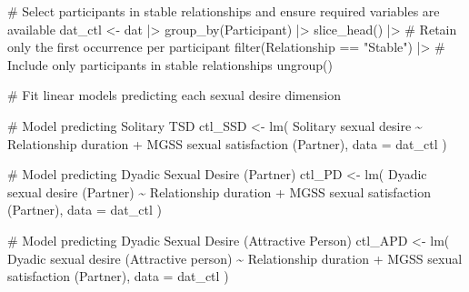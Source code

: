 \documentclass[
  bookmarksnumbered]{article}
\newenvironment{Shaded}{\begin{snugshade}}{\end{snugshade}}
\newcommand{\AttributeTok}[1]{\textcolor[rgb]{0.80,0.80,0.80}{#1}}
\newcommand{\CommentTok}[1]{\textcolor[rgb]{0.50,0.62,0.50}{#1}}
\newcommand{\FunctionTok}[1]{\textcolor[rgb]{0.94,0.94,0.56}{#1}}
\newcommand{\NormalTok}[1]{\textcolor[rgb]{0.80,0.80,0.80}{#1}}
\newcommand{\OtherTok}[1]{\textcolor[rgb]{0.94,0.94,0.56}{#1}}
\newcommand{\SpecialCharTok}[1]{\textcolor[rgb]{0.86,0.64,0.64}{#1}}
\newcommand{\StringTok}[1]{\textcolor[rgb]{0.80,0.58,0.58}{#1}}
\begin{document}
\begin{Shaded}
\begin{Highlighting}[]
\CommentTok{\# Select participants in stable relationships and ensure required variables are available}
\NormalTok{dat\_ctl }\OtherTok{\textless{}{-}}\NormalTok{ dat }\SpecialCharTok{|\textgreater{}}
  \FunctionTok{group\_by}\NormalTok{(Participant) }\SpecialCharTok{|\textgreater{}}
  \FunctionTok{slice\_head}\NormalTok{() }\SpecialCharTok{|\textgreater{}} \CommentTok{\# Retain only the first occurrence per participant}
  \FunctionTok{filter}\NormalTok{(Relationship }\SpecialCharTok{==} \StringTok{"Stable"}\NormalTok{) }\SpecialCharTok{|\textgreater{}} \CommentTok{\# Include only participants in stable relationships}
  \FunctionTok{ungroup}\NormalTok{()}

\CommentTok{\# Fit linear models predicting each sexual desire dimension}

\CommentTok{\# Model predicting Solitary TSD}
\NormalTok{ctl\_SSD }\OtherTok{\textless{}{-}} \FunctionTok{lm}\NormalTok{(}
  \StringTok{\textasciigrave{}}\AttributeTok{Solitary sexual desire}\StringTok{\textasciigrave{}} \SpecialCharTok{\textasciitilde{}} \StringTok{\textasciigrave{}}\AttributeTok{Relationship duration}\StringTok{\textasciigrave{}} \SpecialCharTok{+} \StringTok{\textasciigrave{}}\AttributeTok{MGSS sexual satisfaction (Partner)}\StringTok{\textasciigrave{}}\NormalTok{,}
  \AttributeTok{data =}\NormalTok{ dat\_ctl}
\NormalTok{)}

\CommentTok{\# Model predicting Dyadic Sexual Desire (Partner)}
\NormalTok{ctl\_PD }\OtherTok{\textless{}{-}} \FunctionTok{lm}\NormalTok{(}
  \StringTok{\textasciigrave{}}\AttributeTok{Dyadic sexual desire (Partner)}\StringTok{\textasciigrave{}} \SpecialCharTok{\textasciitilde{}} \StringTok{\textasciigrave{}}\AttributeTok{Relationship duration}\StringTok{\textasciigrave{}} \SpecialCharTok{+} 
    \StringTok{\textasciigrave{}}\AttributeTok{MGSS sexual satisfaction (Partner)}\StringTok{\textasciigrave{}}\NormalTok{,}
  \AttributeTok{data =}\NormalTok{ dat\_ctl}
\NormalTok{)}

\CommentTok{\# Model predicting Dyadic Sexual Desire (Attractive Person)}
\NormalTok{ctl\_APD }\OtherTok{\textless{}{-}} \FunctionTok{lm}\NormalTok{(}
  \StringTok{\textasciigrave{}}\AttributeTok{Dyadic sexual desire (Attractive person)}\StringTok{\textasciigrave{}} \SpecialCharTok{\textasciitilde{}} \StringTok{\textasciigrave{}}\AttributeTok{Relationship duration}\StringTok{\textasciigrave{}} \SpecialCharTok{+}
    \StringTok{\textasciigrave{}}\AttributeTok{MGSS sexual satisfaction (Partner)}\StringTok{\textasciigrave{}}\NormalTok{,}
  \AttributeTok{data =}\NormalTok{ dat\_ctl}
\NormalTok{)}
\end{Highlighting}
\end{Shaded}
\end{document}
